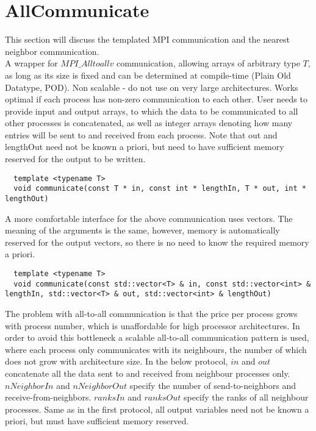 \section{AllCommunicate}
\label{interface-allcommunicate}

This section will discuss the templated MPI communication and the nearest neighbor communication. \\






\noindent
A wrapper for $MPI\_Alltoallv$ communication, allowing arrays of arbitrary type $T$, as long as its size is fixed and can be determined at compile-time (Plain Old Datatype, POD). Non scalable - do not use on very large architectures. Works optimal if each process has non-zero communication to each other. User needs to provide input and output arrays, to which the data to be communicated to all other processes is concatenated, as well as integer arrays denoting how many entries will be sent to and received from each process. Note that out and lengthOut need not be known a priori, but need to have sufficient memory reserved for the output to be written. \\

\begin{mybox}
\begin{lstlisting}
  template <typename T>
  void communicate(const T * in, const int * lengthIn, T * out, int * lengthOut)
\end{lstlisting}
\end{mybox}

\noindent
A more comfortable interface for the above communication uses vectors. The meaning of the arguments is the same, however, memory is automatically reserved for the output vectors, so there is no need to know the required memory a priori. \\

\begin{mybox}
\begin{lstlisting}
  template <typename T>
  void communicate(const std::vector<T> & in, const std::vector<int> & lengthIn, std::vector<T> & out, std::vector<int> & lengthOut)
\end{lstlisting}
\end{mybox}

\noindent
The problem with all-to-all communication is that the price per process grows with process number, which is unaffordable for high processor architectures. In order to avoid this bottleneck a scalable all-to-all communication pattern is used, where each process only communicates with its neighbours, the number of which does not grow with architecture size. In the below protocol, $in$ and $out$ concatenate all the data sent to and received from neighbour processes only. $nNeighborIn$ and $nNeighborOut$ specify the number of send-to-neighbors and receive-from-neighbors. $ranksIn$ and $ranksOut$ specify the ranks of all neighbour processes. Same as in the first protocol, all output variables need not be known a priori, but must have sufficient memory reserved. \\

